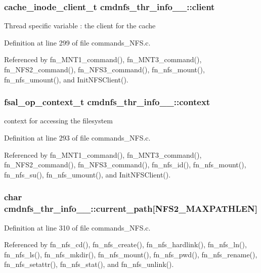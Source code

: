 \subsubsection{\setlength{\rightskip}{0pt plus 5cm}cache\_\-inode\_\-client\_\-t {\bf cmdnfs\_\-thr\_\-info\_\-\_\-::client}}\label{structcmdnfs__thr__info_____o4}


Thread specific variable : the client for the cache 

Definition at line 299 of file commands\_\-NFS.c.

Referenced by fn\_\-MNT1\_\-command(), fn\_\-MNT3\_\-command(), fn\_\-NFS2\_\-command(), fn\_\-NFS3\_\-command(), fn\_\-nfs\_\-mount(), fn\_\-nfs\_\-umount(), and Init\-NFSClient().
\subsubsection{\setlength{\rightskip}{0pt plus 5cm}fsal\_\-op\_\-context\_\-t {\bf cmdnfs\_\-thr\_\-info\_\-\_\-::context}}\label{structcmdnfs__thr__info_____o2}


context for accessing the filesystem 

Definition at line 293 of file commands\_\-NFS.c.

Referenced by fn\_\-MNT1\_\-command(), fn\_\-MNT3\_\-command(), fn\_\-NFS2\_\-command(), fn\_\-NFS3\_\-command(), fn\_\-nfs\_\-id(), fn\_\-nfs\_\-mount(), fn\_\-nfs\_\-su(), fn\_\-nfs\_\-umount(), and Init\-NFSClient().
\subsubsection{\setlength{\rightskip}{0pt plus 5cm}char {\bf cmdnfs\_\-thr\_\-info\_\-\_\-::current\_\-path}[NFS2\_\-MAXPATHLEN]}\label{structcmdnfs__thr__info_____o10}




Definition at line 310 of file commands\_\-NFS.c.

Referenced by fn\_\-nfs\_\-cd(), fn\_\-nfs\_\-create(), fn\_\-nfs\_\-hardlink(), fn\_\-nfs\_\-ln(), fn\_\-nfs\_\-ls(), fn\_\-nfs\_\-mkdir(), fn\_\-nfs\_\-mount(), fn\_\-nfs\_\-pwd(), fn\_\-nfs\_\-rename(), fn\_\-nfs\_\-setattr(), fn\_\-nfs\_\-stat(), and fn\_\-nfs\_\-unlink().
